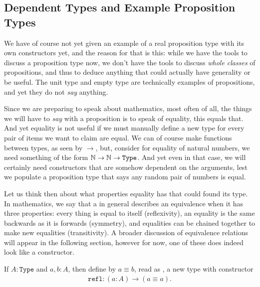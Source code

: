 \documentclass[11pt]{article}
\begin{document}
\subsection{Dependent Types and Example Proposition Types}

We have of course not yet given an example of a real proposition type with its own constructors yet, and the reason for that is this: while we have the tools to discuss a proposition type now, we don't have the tools to discuss \emph{whole classes} of propositions, and thus to deduce anything that could actually have generality or be useful. The unit type and empty type are technically examples of propositions, and yet they do not \emph{say} anything.

Since we are preparing to speak about mathematics, most often of all, the things we will have to \emph{say} with a proposition is to speak of equality, this equals that. And yet equality is not useful if we must manually define a new type for every pair of items we want to claim are equal. We can of course make functions between types, as seen by $\to$, but, consider for equality of natural numbers, we need something of the form $\mathbb{N} \to \mathbb{N} \to \mathtt{Type}$. And yet even in that case, we will certainly need constructors that are somehow dependent on the arguments, lest we populate a proposition type that says any random pair of numbers is equal.

Let us think then about what properties equality has that could found its type. In mathematics, we say that a  in general describes an equivalence when it has three properties: every thing is equal to itself (reflexivity), an equality is the same backwards as it is forwards (symmetry), and equalities can be chained together to make new equalities (transitivity). A broader discussion of equivalence relations will appear in the following section, however for now, one of these does indeed look like a constructor.

\begin{definition}
If $A \colon \mathtt{Type}$ and $a,b \colon A$, then define by $a \equiv b$, read as , a new type with constructor \begin{gather*}
\mathtt{refl} \colon (a \colon A) \to (a \equiv a).
\end{gather*}
\end{definition}
\end{document}
